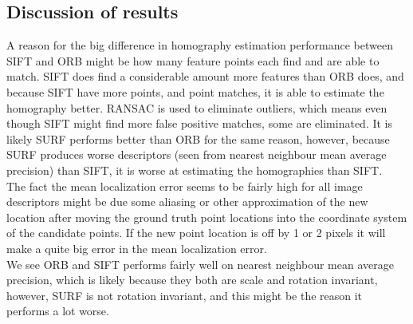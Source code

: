 \subsection{Discussion of results}
A reason for the big difference in homography estimation performance between SIFT and ORB might be how many feature points each find and are able to match. SIFT does find a considerable amount more features than ORB does, and because SIFT have more points, and point matches, it is able to estimate the homography better. RANSAC is used to eliminate outliers, which means even though SIFT might find more false positive matches, some are eliminated. It is likely SURF performs better than ORB for the same reason, however, because SURF produces worse descriptors (seen from nearest neighbour mean average precision) than SIFT, it is worse at estimating the homographies than SIFT.\\
The fact the mean localization error seems to be fairly high for all image descriptors might be due some aliasing or other approximation of the new location after moving the ground truth point locations into the coordinate system of the candidate points. If the new point location is off by 1 or 2 pixels it will make a quite big error in the mean localization error.\\
We see ORB and SIFT performs fairly well on nearest neighbour mean average precision, which is likely because they both are scale and rotation invariant, however, SURF is not rotation invariant, and this might be the reason it performs a lot worse. 